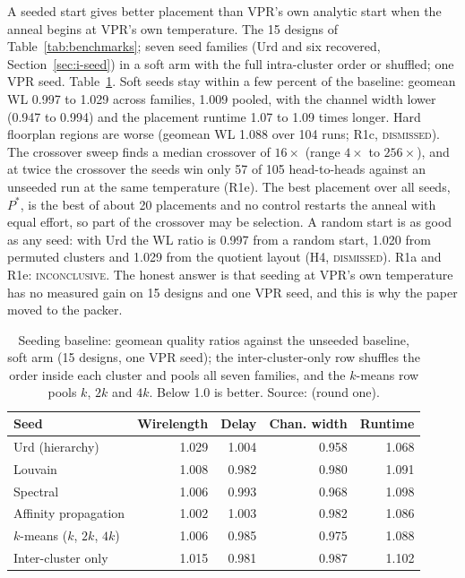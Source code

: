  A seeded start gives better placement than VPR's own analytic start when the anneal begins at VPR's own temperature.
 The 15 designs of Table~\ref{tab:benchmarks}; seven seed families (Urd and six recovered, Section~\ref{sec:i-seed}) in a soft arm with the full intra-cluster order or shuffled; one VPR seed.
 Table~\ref{tab:qor}. Soft seeds stay within a few percent of the baseline: geomean WL 0.997 to 1.029 across families, 1.009 pooled, with the channel width lower (0.947 to 0.994) and the placement runtime 1.07 to 1.09 times longer. %
Hard floorplan regions are worse (geomean WL 1.088 over 104 runs; R1c, \textsc{dismissed}). The crossover sweep finds a median crossover of $16\times$ (range $4\times$ to $256\times$), and at twice the crossover the seeds win only 57 of 105 head-to-heads against an unseeded run at the same temperature (R1e). The best placement over all seeds, $P^*$, is the best of about 20 placements and no control restarts the anneal with equal effort, so part of the crossover may be selection. A random start is as good as any seed: with Urd the WL ratio is 0.997 from a random start, 1.020 from permuted clusters and 1.029 from the quotient layout (H4, \textsc{dismissed}).
 R1a and R1e: \textsc{inconclusive}. The honest answer is that seeding at VPR's own temperature has no measured gain on 15 designs and one VPR seed, and this is why the paper moved to the packer.

\begin{table}[t]
\caption{Seeding baseline: geomean quality ratios against the unseeded baseline, soft arm (15 designs, one VPR seed); the inter-cluster-only row shuffles the order inside each cluster and pools all seven families, and the $k$-means row pools $k$, $2k$ and $4k$. Below 1.0 is better. Source:  (round one).}
\label{tab:qor}
\centering
\footnotesize
\begin{tabular}{@{}lrrrr@{}}
\toprule
Seed & Wirelength & Delay & Chan. width & Runtime \\
\midrule
Urd (hierarchy) & 1.029 & 1.004 & 0.958 & 1.068 \\
Louvain & 1.008 & 0.982 & 0.980 & 1.091 \\
Spectral & 1.006 & 0.993 & 0.968 & 1.098 \\
Affinity propagation & 1.002 & 1.003 & 0.982 & 1.086 \\
$k$-means ($k$, $2k$, $4k$) & 1.006 & 0.985 & 0.975 & 1.088 \\
Inter-cluster only & 1.015 & 0.981 & 0.987 & 1.102 \\
\bottomrule
\end{tabular}
\end{table}


